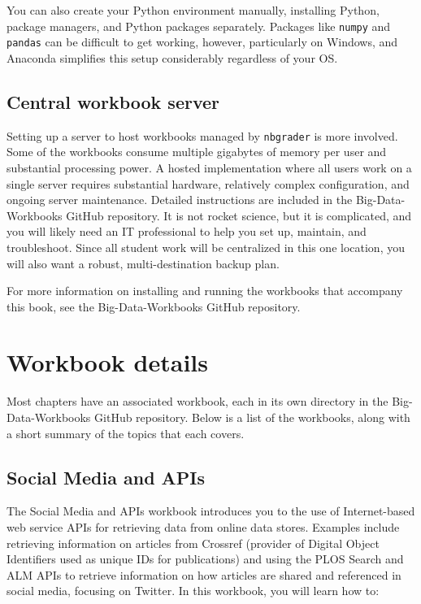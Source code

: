 \documentclass[]{krantz}
\begin{document}
You can also create your Python environment manually, installing Python,
package managers, and Python packages separately. Packages like
\texttt{numpy} and \texttt{pandas} can be difficult to get working,
however, particularly on Windows, and Anaconda simplifies this setup
considerably regardless of your OS.

\subsection{Central workbook server}\label{central-workbook-server}

Setting up a server to host workbooks managed by \texttt{nbgrader} is
more involved. Some of the workbooks consume multiple gigabytes of
memory per user and substantial processing power. A hosted
implementation where all users work on a single server requires
substantial hardware, relatively complex configuration, and ongoing
server maintenance. Detailed instructions are included in the
Big-Data-Workbooks GitHub repository. It is not rocket science, but it
is complicated, and you will likely need an IT professional to help you
set up, maintain, and troubleshoot. Since all student work will be
centralized in this one location, you will also want a robust,
multi-destination backup plan.

For more information on installing and running the workbooks that
accompany this book, see the Big-Data-Workbooks GitHub repository.

\section{Workbook details}\label{workbook-details}

Most chapters have an associated workbook, each in its own directory in
the Big-Data-Workbooks GitHub repository. Below is a list of the
workbooks, along with a short summary of the topics that each covers.

\subsection{Social Media and APIs}\label{social-media-and-apis}

The Social Media and APIs workbook introduces you to the use of
Internet-based web service APIs for retrieving data from online data
stores. Examples include retrieving information on articles from
Crossref (provider of Digital Object Identifiers used as unique IDs for
publications) and using the PLOS Search and ALM APIs to retrieve
information on how articles are shared and referenced in social media,
focusing on Twitter. In this workbook, you will learn how to:
\end{document}
